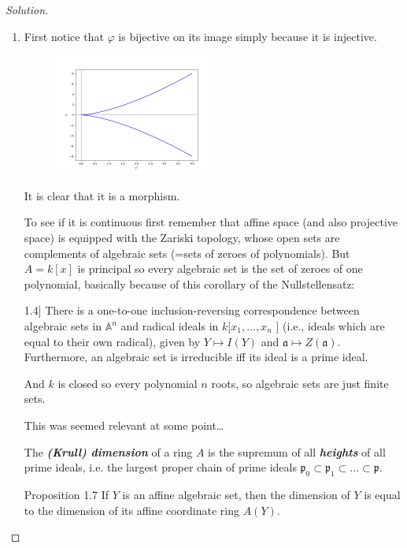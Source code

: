 \begin{proof}[Solution]\leavevmode
	\begin{enumerate}[label=\alph*.]
		\item First notice that $\varphi$ is bijective on its image simply because it is injective.
			\begin{figure}[H]
				\centering
				\includegraphics[width=0.5\textwidth]{fig1.png}
			\end{figure}
			
			It is clear that it is a morphism.

			To see if it is continuous first remember that affine space (and also projective space) is equipped with the Zariski topology, whose open sets are complements of algebraic sets (=sets of zeroes of polynomials). But $A=k[x]$ is principal so every algebraic set is the set of zeroes of one polynomial, basically because of this corollary of the Nullstellensatz:
\begin{coro}[[Hart] 1.4]
	There is a one-to-one inclusion-reversing correspondence between algebraic sets in $\mathbb{A}^{n} $ and radical ideals in $k[x_1,\ldots,x_n$ ] (i.e., ideals which are equal to their own radical), given by $Y\mapsto I(Y)$ and $\mathfrak{a}\mapsto Z(\mathfrak{a})$. Furthermore, an algebraic set is irreducible iff its ideal is a prime ideal.
\end{coro}

And $k$ is closed so every polynomial $n$ roots, so algebraic sets are just finite sets.

{\color{magenta}This was seemed relevant at some point…}

\begin{defn}
	The \textit{\textbf{(Krull) dimension}} of a ring $A$ is the supremum of all \textit{\textbf{heights}} of all prime ideals, i.e. the largest proper chain of prime ideals $\mathfrak{p}_0\subset \mathfrak{p}_1\subset\ldots\subset \mathfrak{p}$.
\end{defn}

\begin{thing7}{Proposition 1.7}\leavevmode
	If $Y$ is an affine algebraic set, then the dimension of $Y$ is equal to the dimension of its affine coordinate ring $A(Y)$.
\end{thing7}


\end{enumerate}
\end{proof}
